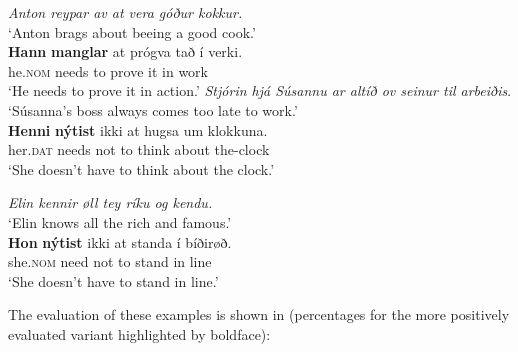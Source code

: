\documentclass[output=paper]{LSP/langsci}
\begin{document}
\begin{xlist}[a2.]
     \label{ex:Thrainsson:10c2}
    \textit{Anton reypar av at vera góður kokkur.}\\
    \glt  ‘Anton brags about beeing a good cook.’\\
    \gll \textbf{Hann}   \textbf{manglar} at   prógva   tað   í verki.\\
          he\textsc{.nom}  needs    to  prove    it    in  work\\
    \glt ‘He needs to prove it in action.’
\newpage
     \label{ex:Thrainsson:10d1}
    \textit{Stjórin hjá Súsannu ar altíð ov seinur til arbeiðis}.\\
    \glt  ‘Súsanna’s boss always comes too late to work.’\\
    \gll \textbf{Henni}   \textbf{nýtist}   ikki   at   hugsa   um klokkuna.\\
          her\textsc{.dat}  needs    not    to  think    about  the-clock\\
	\glt ‘She doesn’t have to think about the clock.’

	 \label{ex:Thrainsson:10d2}
    \textit{Elin kennir øll tey ríku og kendu.}\\
	\glt ‘Elin knows all the rich and famous.’\\
    \gll \textbf{Hon}     \textbf{nýtist} ikki   at   standa   í bíðirøð.\\
	      she\textsc{.nom}  need  not    to  stand    in line\\
    \glt ‘She doesn’t have to stand in line.’
	\end{xlist}
\z


The evaluation of these examples is shown in  (percentages for the more positively evaluated variant highlighted by boldface):
\end{document}
